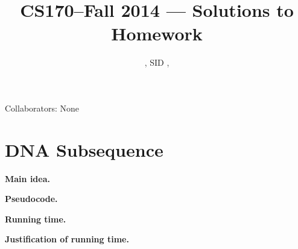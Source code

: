 \documentclass[11pt]{article}
\title{CS170--Fall 2014 --- Solutions to Homework \Homework}
\author{\Name, SID \SID, \texttt{\Login}}
\begin{document}
\maketitle

\noindent
Collaborators: None


\section*{DNA Subsequence}
\noindent
\textbf{Main idea.}

\noindent
\textbf{Pseudocode.}

\noindent
\textbf{Running time.}



\noindent
\textbf{Justification of running time.}

\newpage
\end{document}
